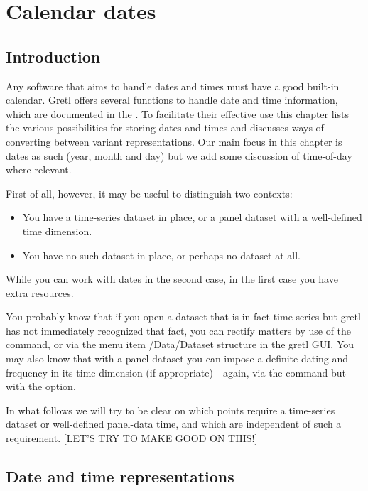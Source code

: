 \chapter{Calendar dates}
\label{chap:calendar}

\section{Introduction}
\label{sec:cal-intro}

Any software that aims to handle dates and times must have a good
built-in calendar. Gretl offers several functions to handle date and
time information, which are documented in the \GCR{}. To facilitate
their effective use this chapter lists the various possibilities for
storing dates and times and discusses ways of converting between
variant representations.  Our main focus in this chapter is dates as
such (year, month and day) but we add some discussion of time-of-day
where relevant.

First of all, however, it may be useful to distinguish two contexts:
\begin{itemize}
\item You have a time-series dataset in place, or a panel dataset with
  a well-defined time dimension.
\item You have no such dataset in place, or perhaps no dataset at all.
\end{itemize}

While you can work with dates in the second case, in the first case
you have extra resources.

You probably know that if you open a dataset that is in fact time
series but gretl has not immediately recognized that fact, you can
rectify matters by use of the  command, or via the menu
item \textsf{/Data/Dataset structure} in the gretl GUI. You may also
know that with a panel dataset you can impose a definite dating and
frequency in its time dimension (if appropriate)---again, via the
 command but with the  option.

In what follows we will try to be clear on which points require a
time-series dataset or well-defined panel-data time, and which are
independent of such a requirement. [LET'S TRY TO MAKE GOOD ON THIS!]

\section{Date and time representations}
\label{sec:cal-representations}

